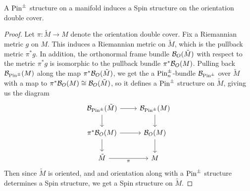 %
\begin{thm}
A $\mathrm{Pin}^\pm$ structure on a manifold induces a Spin structure on the orientation
double cover.
\end{thm}
%
\begin{proof}
Let $ \pi : \tilde{M} \to M$ denote the orientation double cover. Fix a Riemannian
metric $g$ on $M$. This induces a Riemannian metric on $\tilde{M}$, which
is the pullback metric $\pi^*g$. In addition, the orthonormal frame bundle
$\mathcal{B}_O(\tilde{M})$ with respect to the metric $\pi^*g$ is isomorphic to the
pullback bundle $\pi^*\mathcal{B}_O(M)$. Pulling back $\mathcal{B}_{\mathrm{Pin}^\pm}(M)$ along the map
$\pi^*\mathcal{B}_O(\tilde{M})$, we get the a $\mathrm{Pin}^\pm_n$-bundle $\mathcal{B}_{\mathrm{Pin}^\pm}$ over
$\tilde{M}$ with a map to $\pi^*\mathcal{B}_{O}(M) \cong \mathcal{B}_O(\tilde{M})$, so it defines
a $\mathrm{Pin}^\pm$ structure on $\tilde{M}$, giving us the diagram
\[\begin{tikzcd}
\B_{\Pin^\pm}(\tilde{M}) \ar[d]\ar[r] & \B_{\Pin^\pm}(M) \ar[d]\\
\pi^*\B_O(M) \ar[d]\ar[r] & \B_O(M) \ar[d]\\
\tilde{M} \ar[r, "\pi"'] & M
\end{tikzcd}\]
Then since $\tilde{M}$ is oriented, and and orientation along with a $\mathrm{Pin}^\pm$
structure determines a Spin structure, we get a Spin structure on $\tilde{M}$.
\end{proof}
%